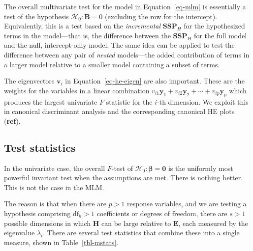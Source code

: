 \documentclass[
  letterpaper,
  10pt,
  krantz2]{krantz}
\begin{document}
The overall multivariate test for the model in Equation~\ref{eq-mlm} is
essentially a test of the hypothesis \(\mathcal{H}_0: \mathbf{B} = 0\)
(excluding the row for the intercept). Equivalently, this is a test
based on the \emph{incremental} \(\mathbf{SSP}_{H}\) for the
hypothesized terms in the model---that is, the difference between the
\(\mathbf{SSP}_{H}\) for the full model and the null, intercept-only
model. The same idea can be applied to test the difference between any
pair of \emph{nested} models---the added contribution of terms in a
larger model relative to a smaller model containing a subset of terms.

The eigenvectors \(\mathbf{v}_i\) in Equation~\ref{eq-he-eigen} are also
important. These are the weights for the variables in a linear
combination
\(v_{i1} \mathbf{y}_1 + v_{i2} \mathbf{y}_2 + \cdots + v_{ip} \mathbf{y}_p\)
which produces the largest univariate \(F\) statistic for the \(i\)-th
dimension. We exploit this in canonical discriminant analysis and the
corresponding canonical HE plots (\textbf{ref}).

\subsection{Test statistics}\label{test-statistics}

In the univariate case, the overall \(F\)-test of
\(\mathcal{H}_0: \boldsymbol{\beta} = \mathbf{0}\) is the uniformly most
powerful invariant test when the assumptions are met. There is nothing
better. This is not the case in the MLM.

The reason is that when there are \(p > 1\) response variables, and we
are testing a hypothesis comprising \(\text{df}_h >1\) coefficients or
degrees of freedom, there are \(s > 1\) possible dimensions in which
\(\mathbf{H}\) can be large relative to \(\mathbf{E}\), each measured by
the eigenvalue \(\lambda_i\). There are several test statistics that
combine these into a single measure, shown in Table~\ref{tbl-mstats}.
\end{document}
